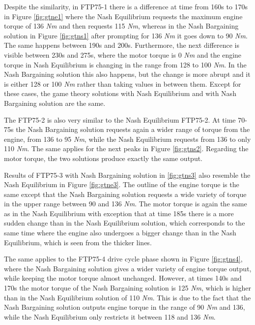 Despite the similarity, in FTP75-1 there is a difference at time from 160s to 170s in Figure \ref{fig:gtne1} where the Nash Equilibrium requests the maximum engine torque of 136 \textit{Nm} and then requests 115 \textit{Nm}, whereas in the Nash Bargaining solution in Figure \ref{fig:gtns1} after prompting for 136 \textit{Nm} it goes down to 90 \textit{Nm}. The same happens between 190s and 200s. Furthermore, the next difference is visible between 230s and 275s, where the motor torque is 0 \textit{Nm} and the engine torque in Nash Equilibrium is changing in the range from 128 to 100 \textit{Nm}. In the Nash Bargaining solution this also happens, but the change is more abrupt and it is either 128 or 100 \textit{Nm} rather than taking values in between them. Except for these cases, the game theory solutions with Nash Equilibrium and with Nash Bargaining solution are the same.

The FTP75-2 is also very similar to the Nash Equilibrium FTP75-2. At time 70-75s the Nash Bargaining solution requests again a wider range of torque from the engine, from 136 to 95 \textit{Nm}, while the Nash Equilibrium requests from 136 to only 110 \textit{Nm}. The same applies for the next peaks in Figure \ref{fig:gtns2}. Regarding the motor torque, the two solutions produce exactly the same output.

Results of FTP75-3 with Nash Bargaining solution in \ref{fig:gtns3} also resemble the Nash Equilibrium in Figure \ref{fig:gtne3}. The outline of the engine torque is the same except that the Nash Bargaining solution requests a wide variety of torque in the upper range between 90 and 136 \textit{Nm}. The motor torque is again the same as in the Nash Equilibrium with exception that at time 185s there is a more sudden change than in the Nash Equilibrium solution, which corresponds to the same time where the engine also undergoes a bigger change than in the Nash Equilibrium, which is seen from the thicker lines.

The same applies to the FTP75-4 drive cycle phase shown in Figure \ref{fig:gtns4}, where the Nash Bargaining solution gives a wider variety of engine torque output, while keeping the motor torque almost unchanged. However, at times 140s and 170s the motor torque of the Nash Bargaining solution is 125 \textit{Nm}, which is higher than in the Nash Equilibrium solution of 110 \textit{Nm}. This is due to the fact that the Nash Bargaining solution outputs engine torque in the range of 90 \textit{Nm} and 136, while the Nash Equilibrium only restricts it between 118 and 136 \textit{Nm}.

